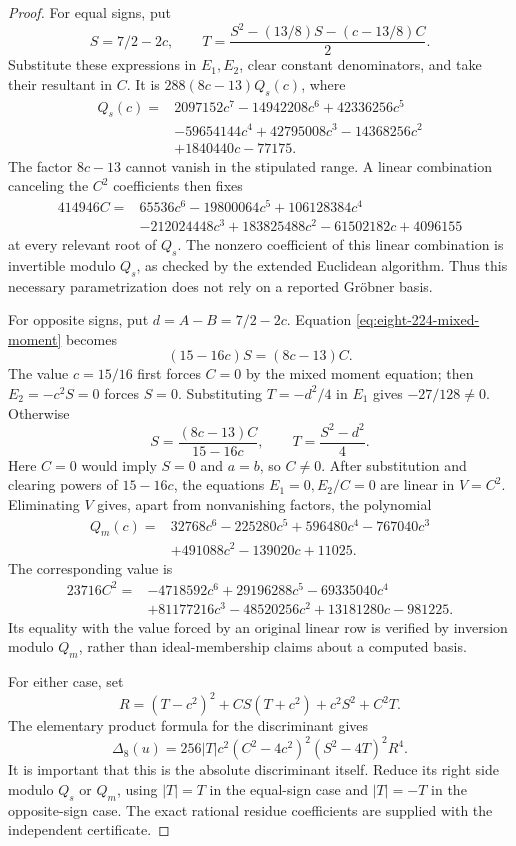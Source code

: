 \documentclass[11pt]{article}
\theoremstyle{remark}
\numberwithin{equation}{section}
\begin{document}
\begin{proof}
For equal signs, put
\[
 S=7/2-2c,\qquad
 T=\frac{S^2-(13/8)S-(c-13/8)C}{2}.
\]
Substitute these expressions in $E_1,E_2$, clear constant
denominators, and take their resultant in $C$. It is
$288(8c-13)Q_s(c)$, where
\begin{align*}
Q_s(c)={}&2097152c^7-14942208c^6+42336256c^5\\
 &-59654144c^4+42795008c^3-14368256c^2\\
 &+1840440c-77175.
\end{align*}
The factor $8c-13$ cannot vanish in the stipulated range.
A linear combination canceling the $C^2$ coefficients then fixes
\begin{align*}
414946C={}&65536c^6-19800064c^5+106128384c^4\\
 &-212024448c^3+183825488c^2-61502182c+4096155
\end{align*}
at every relevant root of $Q_s$. The nonzero coefficient of this
linear combination is invertible modulo $Q_s$, as checked by the
extended Euclidean algorithm. Thus this necessary parametrization
does not rely on a reported Gr\"obner basis.

For opposite signs, put $d=A-B=7/2-2c$. Equation
\eqref{eq:eight-224-mixed-moment} becomes
\[
 (15-16c)S=(8c-13)C.
\]
The value $c=15/16$ first forces $C=0$ by the mixed moment equation;
then $E_2=-c^2S=0$ forces $S=0$. Substituting
$T=-d^2/4$ in $E_1$ gives $-27/128\ne0$.
Otherwise
\[
 S=\frac{(8c-13)C}{15-16c},\qquad T=\frac{S^2-d^2}{4}.
\]
Here $C=0$ would imply $S=0$ and $a=b$, so $C\ne0$.
After substitution and clearing powers of $15-16c$, the equations
$E_1=0,E_2/C=0$ are linear in $V=C^2$. Eliminating $V$ gives,
apart from nonvanishing factors, the polynomial
\begin{align*}
Q_m(c)={}&32768c^6-225280c^5+596480c^4-767040c^3\\
 &+491088c^2-139020c+11025.
\end{align*}
The corresponding value is
\begin{align*}
23716C^2={}&-4718592c^6+29196288c^5-69335040c^4\\
 &+81177216c^3-48520256c^2+13181280c-981225.
\end{align*}
Its equality with the value forced by an original linear row is
verified by inversion modulo $Q_m$, rather than ideal-membership
claims about a computed basis.

For either case, set
\[
 R=(T-c^2)^2+CS(T+c^2)+c^2S^2+C^2T.
\]
The elementary product formula for the discriminant gives
\begin{equation}\label{eq:eight-224-disc-product}
 \Delta_8(u)=256|T|c^2(C^2-4c^2)^2(S^2-4T)^2R^4.
\end{equation}
It is important that this is the absolute discriminant itself.
Reduce its right side modulo $Q_s$ or $Q_m$, using $|T|=T$
in the equal-sign case and $|T|=-T$ in the opposite-sign case.
The exact rational residue coefficients are supplied with the
independent certificate.


\end{proof}
\end{document}
